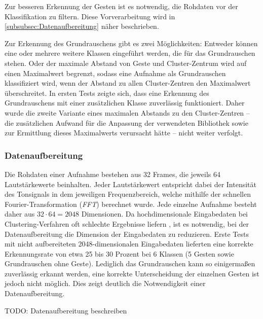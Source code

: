 Zur besseren Erkennung der Gesten ist es notwendig, die Rohdaten vor der Klassifikation zu filtern. Diese Vorverarbeitung wird in \autoref{subsubsec:Datenaufbereitung} näher beschrieben.

Zur Erkennung des Grundrauschens gibt es zwei Möglichkeiten: Entweder können eine oder mehrere weitere Klassen eingeführt werden, die für das Grundrauschen stehen. Oder der maximale Abstand von Geste und Cluster-Zentrum wird auf einen Maximalwert begrenzt, sodass
eine Aufnahme als Grundrauschen klassifiziert wird, wenn der Abstand zu allen Cluster-Zentren den Maximalwert überschreitet.
In ersten Tests zeigte sich, dass eine Erkennung des Grundrauschens mit einer zusätzlichen Klasse zuverlässig funktioniert. Daher wurde die zweite Variante eines maximalen Abstands zu den Cluster-Zentren -- die zusätzlichen Aufwand für die Anpassung der verwendeten Bibliothek sowie zur Ermittlung dieses Maximalwerts verursacht hätte -- nicht weiter verfolgt.


\subsubsection{Datenaufbereitung}\label{subsubsec:Datenaufbereitung}
Die Rohdaten einer Aufnahme bestehen aus 32 Frames, die jeweils 64 Lautstärkewerte beinhalten. Jeder Lautstärkewert entspricht dabei der Intensität des Tonsignals in dem jeweiligen Frequenzbereich, welche mithilfe der schnellen Fourier-Transformation (\emph{FFT}) \cite{fftMathebuch} berechnet wurde. Jede einzelne Aufnahme besteht daher aus $32 \cdot 64 = 2048$ Dimensionen.  Da hochdimensionale Eingabedaten bei Clustering-Verfahren oft schlechte Ergebnisse liefern \cite{kMeansHighDimensions}, ist es notwendig, bei der Datenaufbereitung die Dimension der Eingabedaten zu reduzieren.  Erste Tests mit nicht aufbereiteten 2048-dimensionalen Eingabedaten lieferten eine korrekte Erkennungsrate von etwa 25 bis 30 Prozent bei 6 Klassen (5 Gesten sowie Grundrauschen ohne Geste). Lediglich das Grundrauschen kann so einigermaßen zuverlässig erkannt werden, eine korrekte Unterscheidung der einzelnen Gesten ist jedoch nicht möglich. Dies zeigt deutlich die Notwendigkeit einer Datenaufbereitung.

TODO: Datenaufbereitung beschreiben 

